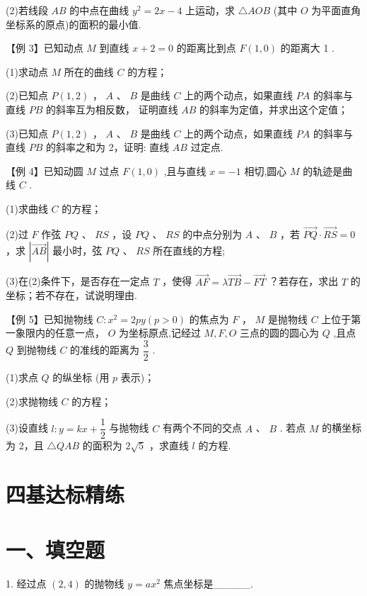 (2)若线段 ${AB}$ 的中点在曲线 ${y}^{2} = {2x} - 4$ 上运动，求 $\bigtriangleup  {AOB}$ (其中 $O$ 为平面直角坐标系的原点)的面积的最小值.


【例 3】已知动点 $M$ 到直线 $x + 2 = 0$ 的距离比到点 $F\left( {1,0}\right)$ 的距离大 1 .

(1)求动点 $M$ 所在的曲线 $C$ 的方程；

(2)已知点 $P\left( {1,2}\right)$ ， $A$ 、 $B$ 是曲线 $C$ 上的两个动点，如果直线 ${PA}$ 的斜率与直线 ${PB}$ 的斜率互为相反数， 证明直线 ${AB}$ 的斜率为定值，并求出这个定值；

(3)已知点 $P\left( {1,2}\right)$ ， $A$ 、 $B$ 是曲线 $C$ 上的两个动点，如果直线 ${PA}$ 的斜率与直线 ${PB}$ 的斜率之和为 2，证明: 直线 ${AB}$ 过定点.

【例 4】已知动圆 $M$ 过点 $F\left( {1,0}\right)$ ,且与直线 $x =  - 1$ 相切,圆心 $M$ 的轨迹是曲线 $C$ .

(1)求曲线 $C$ 的方程；

(2)过 $F$ 作弦 ${PQ}$ 、 ${RS}$ ，设 ${PQ}$ 、 ${RS}$ 的中点分别为 $A$ 、 $B$ ，若 $\overrightarrow{PQ} \cdot  \overrightarrow{RS} = 0$ ，求 $\left| \overrightarrow{AB}\right|$ 最小时，弦 ${PQ}$ 、 ${RS}$ 所在直线的方程;

(3)在(2)条件下，是否存在一定点 $T$ ，使得 $\overrightarrow{AF} = \lambda \overrightarrow{TB} - \overrightarrow{FT}$ ？若存在，求出 $T$ 的坐标；若不存在，试说明理由.

【例 5】已知抛物线 $C : {x}^{2} = {2py}\left( {p > 0}\right)$ 的焦点为 $F$ ， $M$ 是抛物线 $C$ 上位于第一象限内的任意一点， $O$ 为坐标原点,记经过 $M,F,O$ 三点的圆的圆心为 $Q$ ,且点 $Q$ 到抛物线 $C$ 的准线的距离为 $\dfrac{3}{2}$ .

(1)求点 $Q$ 的纵坐标 (用 $p$ 表示)；

(2)求抛物线 $C$ 的方程；

(3)设直线 $l : y = {kx} + \dfrac{1}{2}$ 与抛物线 $C$ 有两个不同的交点 $A$ 、 $B$ . 若点 $M$ 的横坐标为 2，且 $\bigtriangleup  {QAB}$ 的面积为 $2\sqrt{5}$ ，求直线 $l$ 的方程.

\section*{四基达标精练}

\section*{一、填空题}

1. 经过点 $\left( {2,4}\right)$ 的抛物线 $y = a{x}^{2}$ 焦点坐标是\_\_\_\_\_.

